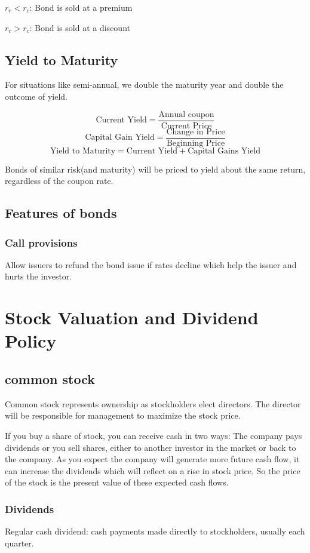 \documentclass[10pt, a4paper]{article}
\begin{document}
$r_r < r_c$: Bond is sold at a premium

$r_r > r_c$: Bond is sold at a discount

\subsection{Yield to Maturity}
    For situations like semi-annual, we double the maturity year and double the outcome of yield.

    $$\text{Current Yield} = \frac{\text{Annual coupon}}{\text{Current Price}}$$
    $$\text{Capital Gain Yield} = \frac{\text{Change in Price}}{\text{Beginning Price}}$$
    $$\text{Yield to Maturity} = \text{Current Yield} + \text{Capital Gains Yield}$$

    Bonds of similar risk(and maturity) will be priced to yield about the same return, regardless of the coupon rate. 

\subsection{Features of bonds}
    \subsubsection{Call provisions}
        Allow issuers to refund the bond issue if rates decline which help the issuer and hurts the investor.  


\section{Stock Valuation and Dividend Policy}
    \subsection{common stock}
        Common stock represents ownership as stockholders elect directors. The director will be responsible for management to maximize the stock price. 

        If you buy a share of stock, you can receive cash in two ways: The company pays dividends or you sell shares, either to another investor in the market or back to the company. As you expect the company will generate more future cash flow, it can increase the dividends which will reflect on a rise in stock price. So the price of the stock is the present value of these expected cash flows. 
    \subsubsection{Dividends}
        Regular cash dividend: cash payments made directly to stockholders, usually each quarter. 
\end{document}
